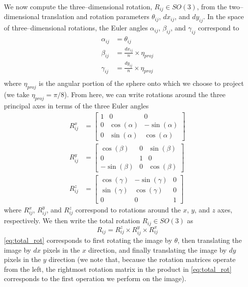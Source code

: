 \documentclass[twocolumn, 11pt]{article}
\begin{document}
We now compute the three--dimensional rotation, $R_{ij} \in SO(3)$, from the two--dimensional translation and rotation parameters $\theta_{ij}$, $dx_{ij}$, and $dy_{ij}$.
%
In the space of three--dimensional rotations, the Euler angles $\alpha_{ij}$, $\beta_{ij}$, and $\gamma_{ij}$ correspond to
\begin{equation} \label{eq:angle_relations}
\begin{aligned}
	\alpha_{ij} &= \theta_{ij} \\
	\beta_{ij} &= \frac{dx_{ij}}{n} \times \eta_{proj} \\
	\gamma_{ij} &= \frac{dy_{ij}}{n} \times \eta_{proj} \\
\end{aligned}
\end{equation}
where $\eta_{proj}$ is the angular portion of the sphere onto which we choose to project (we take $\eta_{proj} =  \pi/8$).
%
From here, we can write rotations around the three principal axes in terms of the three Euler angles
\begin{equation}
\begin{aligned}
	R^x_{ij} &= \begin{bmatrix}
	1 & 0 & 0 \\
    0 & \cos(\alpha) & -\sin(\alpha) \\
    0 & \sin(\alpha) & \cos(\alpha)
	\end{bmatrix} \\
	R^y_{ij} &= \begin{bmatrix}
	\cos(\beta) & 0 & \sin(\beta) \\
    0 & 1 & 0 \\
    -\sin(\beta) & 0 & \cos(\beta)
    \end{bmatrix} \\
	R^z_{ij} &= \begin{bmatrix} 
	\cos(\gamma) & -\sin(\gamma) & 0 \\
    \sin(\gamma) & \cos(\gamma) & 0 \\
    0 & 0 & 1 
    \end{bmatrix}
\end{aligned}
\end{equation}
where $R^x_{ij}$, $R^y_{ij}$, and $R^z_{ij}$ correspond to rotations around the $x$, $y$, and $z$ axes, respectively.
%
We then write the total rotation $R_{ij} \in SO(3)$ as 
\begin{equation} \label{eq:total_rot}
	R_{ij}	 = R^z_{ij} \times R^y_{ij} \times R^x_{ij}
\end{equation}
%
\eqref{eq:total_rot} corresponds to first rotating the image by $\theta$, then translating the image by $dx$ pixels in the $x$ direction, and finally translating the image by $dy$ pixels in the $y$ direction (we note that, because the rotation matrices operate from the left, the rightmost rotation matrix in the product in \eqref{eq:total_rot} corresponds to the first operation we perform on the image).
\end{document}
